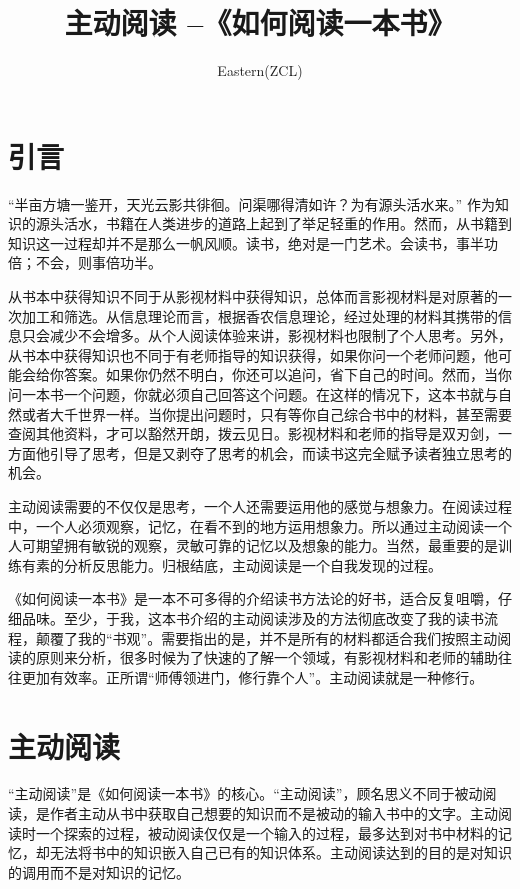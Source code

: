 \documentclass[10pt,a4paper,UTF8]{article}
\author{Eastern(ZCL)}
\date{}
\title{主动阅读 --《如何阅读一本书》}
\begin{document}
\maketitle
\tableofcontents


\section{引言}
\label{sec:orgheadline1}


“半亩方塘一鉴开，天光云影共徘徊。问渠哪得清如许？为有源头活水来。” 作为知识的源头活水，书籍在人类进步的道路上起到了举足轻重的作用。然而，从书籍到知识这一过程却并不是那么一帆风顺。读书，绝对是一门艺术。会读书，事半功倍；不会，则事倍功半。

从书本中获得知识不同于从影视材料中获得知识，总体而言影视材料是对原著的一次加工和筛选。从信息理论而言，根据香农信息理论，经过处理的材料其携带的信息只会减少不会增多。从个人阅读体验来讲，影视材料也限制了个人思考。另外，从书本中获得知识也不同于有老师指导的知识获得，如果你问一个老师问题，他可能会给你答案。如果你仍然不明白，你还可以追问，省下自己的时间。然而，当你问一本书一个问题，你就必须自己回答这个问题。在这样的情况下，这本书就与自然或者大千世界一样。当你提出问题时，只有等你自己综合书中的材料，甚至需要查阅其他资料，才可以豁然开朗，拨云见日。影视材料和老师的指导是双刃剑，一方面他引导了思考，但是又剥夺了思考的机会，而读书这完全赋予读者独立思考的机会。

主动阅读需要的不仅仅是思考，一个人还需要运用他的感觉与想象力。在阅读过程中，一个人必须观察，记忆，在看不到的地方运用想象力。所以通过主动阅读一个人可期望拥有敏锐的观察，灵敏可靠的记忆以及想象的能力。当然，最重要的是训练有素的分析反思能力。归根结底，主动阅读是一个自我发现的过程。

《如何阅读一本书》是一本不可多得的介绍读书方法论的好书，适合反复咀嚼，仔细品味。至少，于我，这本书介绍的主动阅读涉及的方法彻底改变了我的读书流程，颠覆了我的“书观”。需要指出的是，并不是所有的材料都适合我们按照主动阅读的原则来分析，很多时候为了快速的了解一个领域，有影视材料和老师的辅助往往更加有效率。正所谓“师傅领进门，修行靠个人”。主动阅读就是一种修行。

\section{主动阅读}
\label{sec:orgheadline9}


“主动阅读”是《如何阅读一本书》的核心。“主动阅读”，顾名思义不同于被动阅读，是作者主动从书中获取自己想要的知识而不是被动的输入书中的文字。主动阅读时一个探索的过程，被动阅读仅仅是一个输入的过程，最多达到对书中材料的记忆，却无法将书中的知识嵌入自己已有的知识体系。主动阅读达到的目的是对知识的调用而不是对知识的记忆。
\end{document}
